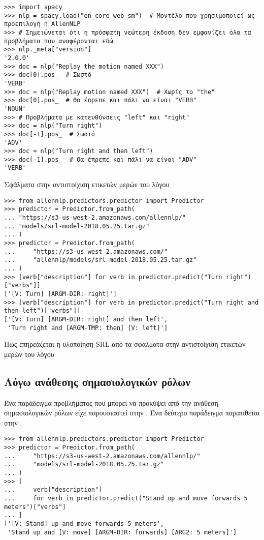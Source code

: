 \begin{listing}[p] %
    \begin{verbatim}
>>> import spacy
>>> nlp = spacy.load("en_core_web_sm")  # Μοντέλο που χρησιμοποιεί ως προεπιλογή η AllenNLP
>>> # Σημειώνεται ότι η πρόσφατη νεώτερη έκδοση δεν εμφανίζει όλα τα προβλήματα που αναφέρονται εδώ
>>> nlp._meta["version"]
'2.0.0'
>>> doc = nlp("Replay the motion named XXX")
>>> doc[0].pos_  # Σωστό
'VERB'
>>> doc = nlp("Replay motion named XXX")  # Χωρίς το "the"
>>> doc[0].pos_  # Θα έπρεπε και πάλι να είναι "VERB"
'NOUN'
>>> # Προβλήματα με κατευθύνσεις "left" και "right"
>>> doc = nlp("Turn right")
>>> doc[-1].pos_  # Σωστό
'ADV'
>>> doc = nlp("Turn right and then left")
>>> doc[-1].pos_  # Θα έπρεπε και πάλι να είναι "ADV"
'VERB'
    \end{verbatim}
    \caption{Σφάλματα στην αντιστοίχιση ετικετών μερών του λόγου}\label{lst:problem-POS}
\end{listing}
\begin{listing}[p]
    \begin{verbatim}
>>> from allennlp.predictors.predictor import Predictor
>>> predictor = Predictor.from_path(
... "https://s3-us-west-2.amazonaws.com/allennlp/"
... "models/srl-model-2018.05.25.tar.gz"
... )
>>> predictor = Predictor.from_path(
...     "https://s3-us-west-2.amazonaws.com/"
...     "allennlp/models/srl-model-2018.05.25.tar.gz"
... )
>>> [verb["description"] for verb in predictor.predict("Turn right")["verbs"]]
['[V: Turn] [ARGM-DIR: right]']
>>> [verb["description"] for verb in predictor.predict("Turn right and then left")["verbs"]]
['[V: Turn] [ARGM-DIR: right] and then left',
 'Turn right and [ARGM-TMP: then] [V: left]']
    \end{verbatim}
    \caption{Πως επηρεάζεται η υλοποίηση SRL από τα σφάλματα στην αντιστοίχιση ετικετών μερών του λόγου}\label{lst:problem-POS-SRL}
\end{listing}

\subsection{Λόγω ανάθεσης σημασιολογικών ρόλων}
Ένα παράδειγμα προβλήματος που μπορεί να προκύψει από την ανάθεση σημασιολογικών ρόλων είχε παρουσιαστεί στην .
Ένα δεύτερο παράδειγμα παρατίθεται στην .

\begin{listing}[t]
    \begin{verbatim}
>>> from allennlp.predictors.predictor import Predictor
>>> predictor = Predictor.from_path(
...     "https://s3-us-west-2.amazonaws.com/allennlp/"
...     "models/srl-model-2018.05.25.tar.gz"
... )
>>> [
...     verb["description"]
...     for verb in predictor.predict("Stand up and move forwards 5 meters")["verbs"]
... ]
['[V: Stand] up and move forwards 5 meters',
 'Stand up and [V: move] [ARGM-DIR: forwards] [ARG2: 5 meters]']
\end{verbatim}
    \label{lst:srl-problem}
\end{listing}

